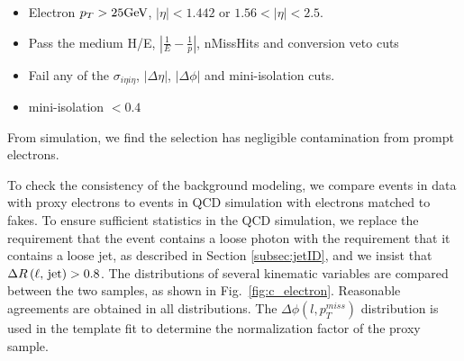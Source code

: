 \documentclass[thesis.tex]{subfiles}
\renewcommand\_{\textunderscore\allowbreak}
\begin{document}
\begin{itemize}
    \item Electron $p_T > 25\text{GeV}$, $|\eta| < 1.442$ or $1.56 < |\eta| < 2.5$.
    \item Pass the medium H/E, $|\frac{1}{E}-\frac{1}{p}|$, nMissHits and conversion veto cuts
    \item Fail any of the $\sigma_{i\eta i\eta}$, $|\Delta\eta|$, $|\Delta\phi|$ and mini-isolation cuts. 
		\item mini-isolation $< 0.4$
\end{itemize}
From simulation, we find the selection has negligible contamination from prompt
electrons.

To check the consistency of the background modeling, we compare events in data
with proxy electrons to events in QCD simulation with electrons matched to
fakes. To ensure sufficient statistics in the QCD simulation, we replace the
requirement that the event contains a loose photon with the requirement that it
contains a loose jet, as described in Section \ref{subsec:jetID}, and we insist that
$\Delta R\left(\textrm{\ensuremath{\ell}, jet}\right) > 0.8$. The distributions of several
kinematic variables are compared between the two samples, as shown in
Fig.~\ref{fig:c_electron}. Reasonable agreements are obtained in all distributions.
The $\Delta\phi\left(l, p_{T}^{miss}\right)$ distribution
is used in the template fit to determine the normalization factor of the proxy
sample.
\end{document}
